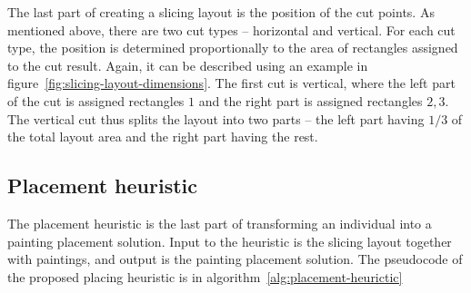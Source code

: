 The last part of creating a slicing layout is the position of the cut points.
As mentioned above, there are two cut types – horizontal and vertical.
For each cut type, the position is determined proportionally to the area of rectangles assigned to the cut result.
Again, it can be described using an example in figure~\ref{fig:slicing-layout-dimensions}.
The first cut is vertical, where the left part of the cut is assigned rectangles $1$ and the right part is assigned rectangles $2,3$.
The vertical cut thus splits the layout into two parts – the left part having $1/3$ of the total layout area and the right part
having the rest.




\newpage

\subsection{Placement heuristic}\label{subsec:placement-heuristic}

The placement heuristic is the last part of transforming an individual into a painting placement solution.
Input to the heuristic is the slicing layout together with paintings, and output is the painting placement solution.
The pseudocode of the proposed placing heuristic is in algorithm~\ref{alg:placement-heurictic}

